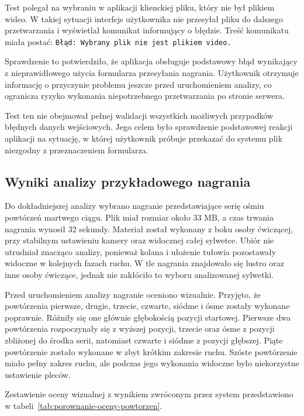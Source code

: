 Test polegał na wybraniu w aplikacji klienckiej pliku, który nie był plikiem wideo. W takiej sytuacji interfejs użytkownika nie przesyłał pliku do dalszego przetwarzania i wyświetlał komunikat informujący o błędzie. Treść komunikatu miała postać: \texttt{Błąd: Wybrany plik nie jest plikiem video.}

Sprawdzenie to potwierdziło, że aplikacja obsługuje podstawowy błąd wynikający z nieprawidłowego użycia formularza przesyłania nagrania. Użytkownik otrzymuje informację o przyczynie problemu jeszcze przed uruchomieniem analizy, co ogranicza ryzyko wykonania niepotrzebnego przetwarzania po stronie serwera.

Test ten nie obejmował pełnej walidacji wszystkich możliwych przypadków błędnych danych wejściowych. Jego celem było sprawdzenie podstawowej reakcji aplikacji na sytuację, w której użytkownik próbuje przekazać do systemu plik niezgodny z przeznaczeniem formularza.

\subsection{Wyniki analizy przykładowego nagrania}

Do dokładniejszej analizy wybrano nagranie przedstawiające serię ośmiu powtórzeń martwego ciągu. Plik miał rozmiar około 33 MB, a czas trwania nagrania wynosił 32 sekundy. Materiał został wykonany z boku osoby ćwiczącej, przy stabilnym ustawieniu kamery oraz widocznej całej sylwetce. Ubiór nie utrudniał znacząco analizy, ponieważ kolana i ułożenie tułowia pozostawały widoczne w kolejnych fazach ruchu. W tle nagrania znajdowało się lustro oraz inne osoby ćwiczące, jednak nie zakłóciło to wyboru analizowanej sylwetki.

Przed uruchomieniem analizy nagranie oceniono wizualnie. Przyjęto, że powtórzenia pierwsze, drugie, trzecie, czwarte, siódme i ósme zostały wykonane poprawnie. Różniły się one głównie głębokością pozycji startowej. Pierwsze dwa powtórzenia rozpoczynały się z wyższej pozycji, trzecie oraz ósme z pozycji zbliżonej do środka serii, natomiast czwarte i siódme z pozycji głębszej. Piąte powtórzenie zostało wykonane w zbyt krótkim zakresie ruchu. Szóste powtórzenie miało pełny zakres ruchu, ale podczas jego wykonania widoczne było niekorzystne ustawienie pleców.

Zestawienie oceny wizualnej z wynikiem zwróconym przez system przedstawiono w tabeli~\ref{tab:porownanie-oceny-powtorzen}.

